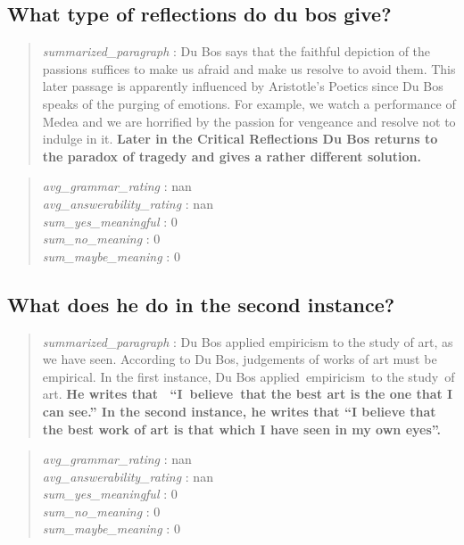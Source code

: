 \hypertarget{what-type-of-reflections-do-du-bos-give}{%
\subsection{What type of reflections do du bos
give?}\label{what-type-of-reflections-do-du-bos-give}}

\begin{quote}
\emph{summarized\_paragraph} : Du Bos says that the faithful depiction
of the passions suffices to make us afraid and make us resolve to avoid
them. This later passage is apparently influenced by Aristotle's Poetics
since Du Bos speaks of the purging of emotions. For example, we watch a
performance of Medea and we are horrified by the passion for vengeance
and resolve not to indulge in it. \textbf{Later in the Critical
Reflections Du Bos returns to the paradox of tragedy and gives a rather
different solution.}
\end{quote}

\begin{quote}
\emph{avg\_grammar\_rating} : nan\\
\emph{avg\_answerability\_rating} : nan\\
\emph{sum\_yes\_meaningful} : 0\\
\emph{sum\_no\_meaning} : 0\\
\emph{sum\_maybe\_meaning} : 0
\end{quote}

\hypertarget{what-does-he-do-in-the-second-instance}{%
\subsection{What does he do in the second
instance?}\label{what-does-he-do-in-the-second-instance}}

\begin{quote}
\emph{summarized\_paragraph} : Du Bos applied empiricism to the study of
art, as we have seen. According to Du Bos, judgements of works of art
must be empirical. In the first instance, Du Bos applied~empiricism~to
the study~of art. \textbf{He writes that ~``I~believe~that the best art
is the one that I can see.'' In the second instance, he writes that ``I
believe that the best work of art is that which I have seen in my own
eyes''.}
\end{quote}

\begin{quote}
\emph{avg\_grammar\_rating} : nan\\
\emph{avg\_answerability\_rating} : nan\\
\emph{sum\_yes\_meaningful} : 0\\
\emph{sum\_no\_meaning} : 0\\
\emph{sum\_maybe\_meaning} : 0
\end{quote}

